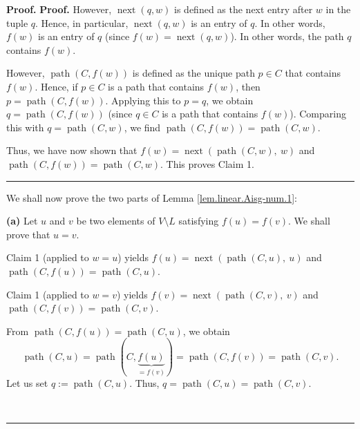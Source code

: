 \documentclass[numbers=enddot,12pt,final,onecolumn,notitlepage]{scrartcl}%
\numberwithin{exer}{section}
\theoremstyle{definition}
\newenvironment{proof}[1][Proof]{\noindent\textbf{#1.} }{\ \rule{0.5em}{0.5em}}
\newenvironment{verlong}{}{}
\begin{document}
\begin{verlong}
\begin{proof}
\begin{proof}
However, $\operatorname*{next}\left(  q,w\right)  $ is defined as the next
entry after $w$ in the tuple $q$. Hence, in particular, $\operatorname*{next}%
\left(  q,w\right)  $ is an entry of $q$. In other words, $f\left(  w\right)
$ is an entry of $q$ (since $f\left(  w\right)  =\operatorname*{next}\left(
q,w\right)  $). In other words, the path $q$ contains $f\left(  w\right)  $.

However, $\operatorname*{path}\left(  C,f\left(  w\right)  \right)  $ is
defined as the unique path $p\in C$ that contains $f\left(  w\right)  $.
Hence, if $p\in C$ is a path that contains $f\left(  w\right)  $, then
$p=\operatorname*{path}\left(  C,f\left(  w\right)  \right)  $. Applying this
to $p=q$, we obtain $q=\operatorname*{path}\left(  C,f\left(  w\right)
\right)  $ (since $q\in C$ is a path that contains $f\left(  w\right)  $).
Comparing this with $q=\operatorname*{path}\left(  C,w\right)  $, we find
$\operatorname*{path}\left(  C,f\left(  w\right)  \right)
=\operatorname*{path}\left(  C,w\right)  $.

Thus, we have now shown that $f\left(  w\right)  =\operatorname*{next}\left(
\operatorname*{path}\left(  C,w\right)  ,\ w\right)  $ and
$\operatorname*{path}\left(  C,f\left(  w\right)  \right)
=\operatorname*{path}\left(  C,w\right)  $. This proves Claim 1.
\end{proof}

We shall now prove the two parts of Lemma \ref{lem.linear.Aisg-num.1}:
\medskip

\textbf{(a)} Let $u$ and $v$ be two elements of $V\setminus L$ satisfying
$f\left(  u\right)  =f\left(  v\right)  $. We shall prove that $u=v$.

Claim 1 (applied to $w=u$) yields $f\left(  u\right)  =\operatorname*{next}%
\left(  \operatorname*{path}\left(  C,u\right)  ,\ u\right)  $ and
$\operatorname*{path}\left(  C,f\left(  u\right)  \right)
=\operatorname*{path}\left(  C,u\right)  $.

Claim 1 (applied to $w=v$) yields $f\left(  v\right)  =\operatorname*{next}%
\left(  \operatorname*{path}\left(  C,v\right)  ,\ v\right)  $ and
$\operatorname*{path}\left(  C,f\left(  v\right)  \right)
=\operatorname*{path}\left(  C,v\right)  $.

From $\operatorname*{path}\left(  C,f\left(  u\right)  \right)
=\operatorname*{path}\left(  C,u\right)  $, we obtain%
\[
\operatorname*{path}\left(  C,u\right)  =\operatorname*{path}\left(
C,\underbrace{f\left(  u\right)  }_{=f\left(  v\right)  }\right)
=\operatorname*{path}\left(  C,f\left(  v\right)  \right)
=\operatorname*{path}\left(  C,v\right)  .
\]
Let us set $q:=\operatorname*{path}\left(  C,u\right)  $. Thus,
$q=\operatorname*{path}\left(  C,u\right)  =\operatorname*{path}\left(
C,v\right)  $.


\end{proof}
\end{verlong}
\end{document}
